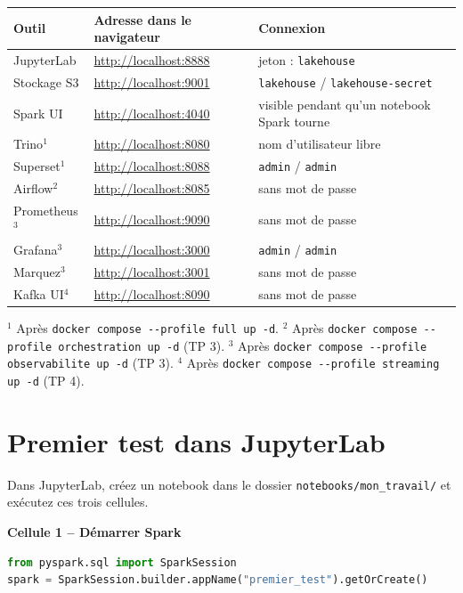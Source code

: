 \documentclass[11pt,a4paper]{article}
\newcommand{\cmd}[1]{\texttt{#1}}
\begin{document}
\begin{center}
\renewcommand{\arraystretch}{1.25}
\begin{tabularx}{\textwidth}{@{}l l X@{}}
\toprule
\textbf{Outil} & \textbf{Adresse dans le navigateur} & \textbf{Connexion} \\
\midrule
JupyterLab        & \url{http://localhost:8888} & jeton : \texttt{lakehouse} \\
Stockage S3       & \url{http://localhost:9001} & \texttt{lakehouse} / \texttt{lakehouse-secret} \\
Spark UI          & \url{http://localhost:4040} & visible pendant qu'un notebook Spark tourne \\
Trino$^{1}$       & \url{http://localhost:8080} & nom d'utilisateur libre \\
Superset$^{1}$     & \url{http://localhost:8088} & \texttt{admin} / \texttt{admin} \\
Airflow$^{2}$    & \url{http://localhost:8085} & sans mot de passe \\
Prometheus$^{3}$ & \url{http://localhost:9090} & sans mot de passe \\
Grafana$^{3}$ & \url{http://localhost:3000} & \texttt{admin} / \texttt{admin} \\
Marquez$^{3}$ & \url{http://localhost:3001} & sans mot de passe \\
Kafka UI$^{4}$ & \url{http://localhost:8090} & sans mot de passe \\
\bottomrule
\end{tabularx}

\smallskip
{\footnotesize $^{1}$ Après \cmd{docker compose -{}-profile full up -d}. \quad
$^{2}$ Après \cmd{docker compose -{}-profile orchestration up -d} (TP 3). \quad
$^{3}$ Après \cmd{docker compose -{}-profile observabilite up -d} (TP 3). \quad
$^{4}$ Après \cmd{docker compose -{}-profile streaming up -d} (TP 4).}
\end{center}

\section{Premier test dans JupyterLab}

Dans JupyterLab, créez un notebook dans le dossier \texttt{notebooks/mon\_travail/} et exécutez ces trois cellules.

\textbf{Cellule 1 -- Démarrer Spark}
\begin{lstlisting}[language=Python]
from pyspark.sql import SparkSession
spark = SparkSession.builder.appName("premier_test").getOrCreate()
\end{lstlisting}
\end{document}
